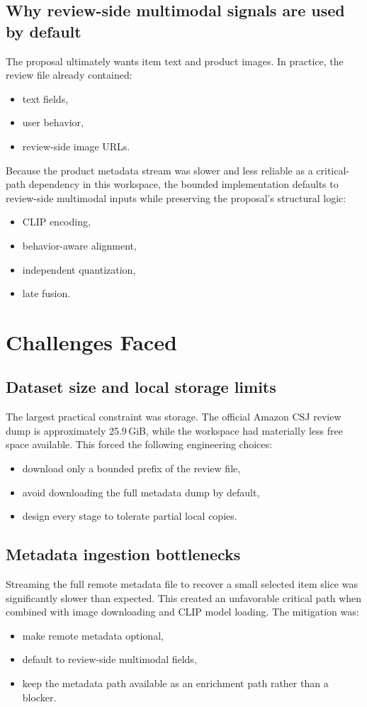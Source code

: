 \documentclass[11pt]{article}
\begin{document}
\subsection{Why review-side multimodal signals are used by default}
The proposal ultimately wants item text and product images. In practice, the review file already contained:
\begin{itemize}[leftmargin=1.5em]
    \item text fields,
    \item user behavior,
    \item review-side image URLs.
\end{itemize}

Because the product metadata stream was slower and less reliable as a critical-path dependency in this workspace, the bounded implementation defaults to review-side multimodal inputs while preserving the proposal's structural logic:
\begin{itemize}[leftmargin=1.5em]
    \item CLIP encoding,
    \item behavior-aware alignment,
    \item independent quantization,
    \item late fusion.
\end{itemize}

\section{Challenges Faced}
\subsection{Dataset size and local storage limits}
The largest practical constraint was storage. The official Amazon CSJ review dump is approximately 25.9\,GiB, while the workspace had materially less free space available. This forced the following engineering choices:
\begin{itemize}[leftmargin=1.5em]
    \item download only a bounded prefix of the review file,
    \item avoid downloading the full metadata dump by default,
    \item design every stage to tolerate partial local copies.
\end{itemize}

\subsection{Metadata ingestion bottlenecks}
Streaming the full remote metadata file to recover a small selected item slice was significantly slower than expected. This created an unfavorable critical path when combined with image downloading and CLIP model loading. The mitigation was:
\begin{itemize}[leftmargin=1.5em]
    \item make remote metadata optional,
    \item default to review-side multimodal fields,
    \item keep the metadata path available as an enrichment path rather than a blocker.
\end{itemize}
\end{document}
